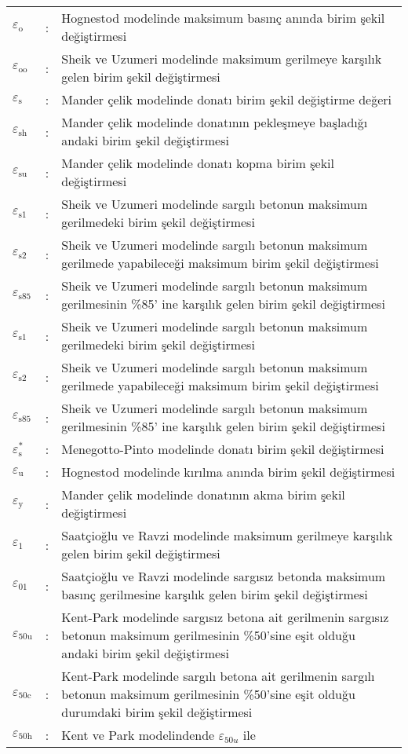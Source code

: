 \begin{longtable}[c]{>{\raggedright}p{1cm}l>{\raggedright}p{13.4cm}}
$\varepsilon_{\text{o}}$  & :  & Hognestod modelinde maksimum basınç anında birim şekil değiştirmesi\tabularnewline
$\varepsilon_{\text{oo}}$  & :  & Sheik ve Uzumeri modelinde maksimum gerilmeye karşılık gelen birim
şekil değiştirmesi \tabularnewline
$\varepsilon_{\text{s}}$  & :  & Mander çelik modelinde donatı birim şekil değiştirme değeri\tabularnewline
$\varepsilon_{\text{sh}}$  & :  & Mander çelik modelinde donatının pekleşmeye başladığı andaki birim
şekil değiştirmesi\tabularnewline
$\varepsilon_{\text{su}}$  & :  & Mander çelik modelinde donatı kopma birim şekil değiştirmesi\tabularnewline
$\varepsilon_{\text{s1}}$  & :  & Sheik ve Uzumeri modelinde sargılı betonun maksimum gerilmedeki birim
şekil değiştirmesi\tabularnewline
$\varepsilon_{\text{s2}}$  & :  & Sheik ve Uzumeri modelinde sargılı betonun maksimum gerilmede yapabileceği
maksimum birim şekil değiştirmesi\tabularnewline
$\varepsilon_{\text{s85}}$  & :  & Sheik ve Uzumeri modelinde sargılı betonun maksimum gerilmesinin \%85'
ine karşılık gelen birim şekil değiştirmesi\tabularnewline
$\varepsilon_{\text{s1}}$  & :  & Sheik ve Uzumeri modelinde sargılı betonun maksimum gerilmedeki birim
şekil değiştirmesi\tabularnewline
$\varepsilon_{\text{s2}}$  & :  & Sheik ve Uzumeri modelinde sargılı betonun maksimum gerilmede yapabileceği
maksimum birim şekil değiştirmesi\tabularnewline
$\varepsilon_{\text{s85}}$  & :  & Sheik ve Uzumeri modelinde sargılı betonun maksimum gerilmesinin \%85'
ine karşılık gelen birim şekil değiştirmesi\tabularnewline
$\varepsilon_{\text{s}}^{*}$  & :  & Menegotto-Pinto modelinde donatı birim şekil değiştirmesi\tabularnewline
$\varepsilon_{\text{u}}$  & :  & Hognestod modelinde kırılma anında birim şekil değiştirmesi\tabularnewline
$\varepsilon_{\text{y}}$  & :  & Mander çelik modelinde donatının akma birim şekil değiştirmesi\tabularnewline
$\varepsilon_{\text{1}}$  & :  & Saatçioğlu ve Ravzi modelinde maksimum gerilmeye karşılık gelen birim
şekil değiştirmesi\tabularnewline
$\varepsilon_{\text{01}}$  & :  & Saatçioğlu ve Ravzi modelinde sargısız betonda maksimum basınç gerilmesine
karşılık gelen birim şekil değiştirmesi\tabularnewline
$\varepsilon_{\text{50u}}$  & :  & Kent-Park modelinde sargısız betona ait gerilmenin sargısız betonun
maksimum gerilmesinin \%50’sine eşit olduğu andaki birim şekil değiştirmesi\tabularnewline
$\varepsilon_{\text{50c}}$  & :  & Kent-Park modelinde sargılı betona ait gerilmenin sargılı betonun
maksimum gerilmesinin \%50’sine eşit olduğu durumdaki birim şekil
değiştirmesi\tabularnewline
$\varepsilon_{\text{50h}}$  & :  & Kent ve Park modelindende $\mathit{\varepsilon_{\text{50u}}}$ ile

\end{longtable}
